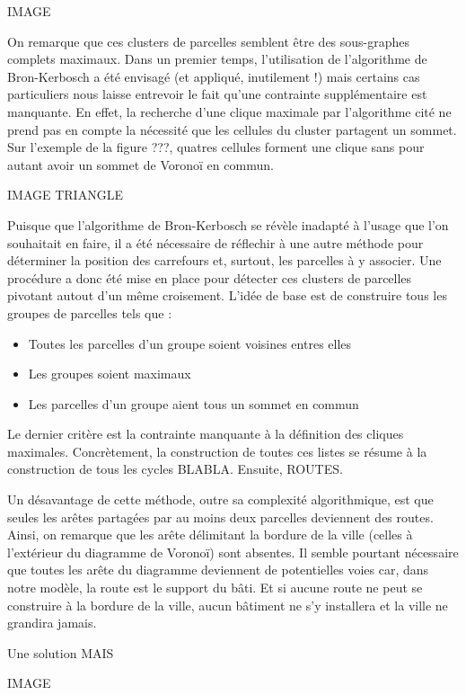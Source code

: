 \documentclass[12pt]{article}
\begin{document}
IMAGE

On remarque que ces clusters de parcelles semblent être des
sous-graphes complets maximaux. Dans un premier temps, l'utilisation
de l'algorithme de Bron-Kerbosch a été envisagé (et appliqué,
inutilement !) mais certains cas particuliers nous laisse entrevoir
le fait qu'une contrainte supplémentaire est manquante. En effet, la
recherche d'une clique maximale par l'algorithme cité ne prend pas en
compte la nécessité que les cellules du cluster partagent un
sommet. Sur l'exemple de la figure ???, quatres cellules forment une
clique sans pour autant avoir un sommet de Voronoï en commun.

IMAGE TRIANGLE

Puisque que l'algorithme de Bron-Kerbosch se révèle inadapté à l'usage
que l'on souhaitait en faire, il a été nécessaire de réflechir à une
autre méthode pour déterminer la position des carrefours et, surtout,
les parcelles à y associer. Une procédure a donc été mise en place
pour détecter ces clusters de parcelles pivotant autout d'un même
croisement. L'idée de base est de construire tous les groupes de
parcelles tels que :

\begin{itemize}
\item{Toutes les parcelles d'un groupe soient voisines entres elles}
\item{Les groupes soient maximaux}
\item{Les parcelles d'un groupe aient tous un sommet en commun}
\end{itemize}

Le dernier critère est la contrainte manquante à la définition des
cliques maximales. Concrètement, la construction de toutes ces listes
se résume à la construction de tous les cycles BLABLA. Ensuite,
ROUTES.

Un désavantage de cette méthode, outre sa complexité algorithmique,
est que seules les arêtes partagées par au moins deux parcelles
deviennent des routes. Ainsi, on remarque que les arête délimitant la
bordure de la ville (celles à l'extérieur du diagramme de Voronoï)
sont absentes. Il semble pourtant nécessaire que toutes les arête du
diagramme deviennent de potentielles voies car, dans notre modèle, la
route est le support du bâti. Et si aucune route ne peut se construire
à la bordure de la ville, aucun bâtiment ne s'y installera et la ville
ne grandira jamais.

Une solution MAIS

IMAGE
\end{document}
